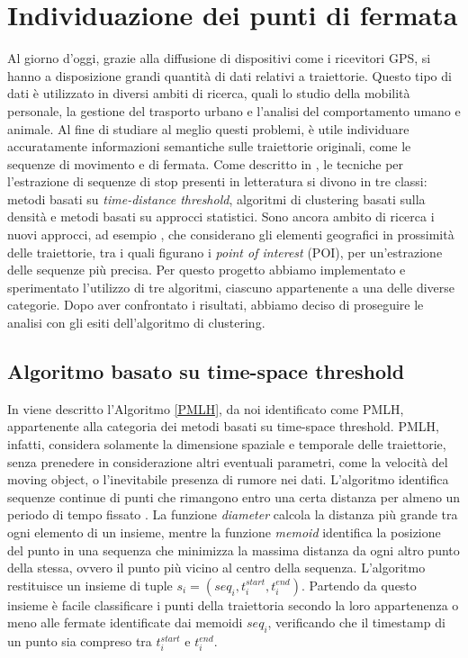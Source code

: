 \documentclass[12pt]{article}
\begin{document}
\section{Individuazione dei punti di fermata}
Al giorno d'oggi, grazie alla diffusione di dispositivi come i ricevitori GPS, si hanno a disposizione grandi quantità di dati relativi a traiettorie.
Questo tipo di dati è utilizzato in diversi ambiti di ricerca, quali lo studio della mobilità personale, la gestione del trasporto urbano e l'analisi del comportamento umano e animale.
Al fine di studiare al meglio questi problemi, è utile individuare accuratamente informazioni semantiche sulle traiettorie originali, come le sequenze di movimento e di fermata.
Come descritto in \cite{ReviewMethods}, le tecniche per l'estrazione di sequenze di stop presenti in letteratura si divono in tre classi: metodi basati su \emph{time-distance threshold}, algoritmi di clustering basati sulla densità e metodi basati su approcci statistici.
Sono ancora ambito di ricerca i nuovi approcci, ad esempio \cite{ReviewMethods}, che considerano gli elementi geografici in prossimità delle traiettorie, tra i quali figurano i \emph{point of interest} (POI), per un'estrazione delle sequenze più precisa.
Per questo progetto abbiamo implementato e sperimentato l'utilizzo di tre algoritmi, ciascuno appartenente a una delle diverse categorie. Dopo aver confrontato i risultati, abbiamo deciso di proseguire le analisi con gli esiti dell'algoritmo di clustering.

\subsection{Algoritmo basato su time-space threshold}
In \cite{SpaceTimeTreshold} viene descritto l'Algoritmo \ref{PMLH}, da noi identificato come PMLH, appartenente alla categoria dei metodi basati su time-space threshold.
PMLH, infatti, considera solamente la dimensione spaziale e temporale delle traiettorie, senza prenedere in considerazione altri eventuali parametri, come la velocità del moving object, o l'inevitabile presenza di rumore nei dati.
L'algoritmo identifica sequenze continue di punti che rimangono entro una certa distanza per almeno un periodo di tempo fissato .
La funzione \emph{diameter} calcola la distanza più grande tra ogni elemento di un insieme, mentre la funzione \emph{memoid} identifica la posizione del punto in una sequenza che minimizza la massima distanza da ogni altro punto della stessa, ovvero il punto più vicino al centro della sequenza.
L'algoritmo restituisce un insieme di tuple  $s_i=(seq_i, t_i^{start}, t_i^{end})$. Partendo da questo insieme è facile classificare i punti della traiettoria secondo la loro appartenenza o meno alle fermate identificate dai memoidi $seq_i$, verificando che il timestamp di un punto sia compreso tra $t_i^{start}$ e $t_i^{end}$.
\end{document}
